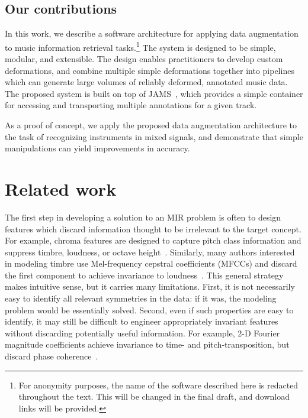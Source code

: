\documentclass{article}
\begin{document}

\subsection{Our contributions}
In this work, we describe a software architecture for applying data augmentation to music
information retrieval tasks.\footnote{For anonymity purposes, the name of the software
    described here is redacted throughout the text.  This will be changed in the final
draft, and download links will be provided.}
The system is designed to be simple, modular, and
extensible. The design enables practitioners to develop custom deformations, and combine
multiple simple deformations together into pipelines which can generate large volumes of
reliably deformed, annotated music data.  The proposed system is built on top of
JAMS~\cite{humphreyjams}, which provides a simple container for accessing and
transporting multiple annotations for a given track.

As a proof of concept, we apply the proposed data augmentation architecture to the
task of recognizing instruments in mixed signals, and demonstrate that simple
manipulations can yield improvements in accuracy.

\section{Related work}

The first step in developing a solution to an MIR problem is often to
design features which discard information thought to be irrelevant to the target
concept.  For example, chroma features are designed to capture pitch class information
and suppress timbre, loudness, or octave height~\cite{muller2011chroma}.
Similarly, many authors interested in modeling timbre
use Mel-frequency cepstral coefficients (MFCCs) and discard the first component to
achieve invariance to loudness~\cite{pampalk2004matlab}.
This general strategy makes intuitive sense, but it carries many limitations.
First, it is not necessarily easy to identify all relevant symmetries in the
data: if it was, the modeling problem would be essentially solved.
Second, even if such properties are easy to identify, it may still be difficult to
engineer appropriately invariant features without discarding potentially useful
information.  For example, 2-D Fourier magnitude coefficients achieve invariance to
time- and pitch-transposition, but discard phase coherence~\cite{ellis2012large}.
\end{document}
